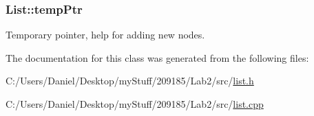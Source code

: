 \subsubsection[{temp\+Ptr}]{\setlength{\rightskip}{0pt plus 5cm}List\+::temp\+Ptr\hspace{0.3cm}{\ttfamily [private]}}\label{class_list_a9a3a51357cab8c53233ba00b8545eb5a}
Temporary pointer, help for adding new nodes. 

The documentation for this class was generated from the following files\+:\begin{DoxyCompactItemize}
\item 
C\+:/\+Users/\+Daniel/\+Desktop/my\+Stuff/209185/\+Lab2/src/\hyperlink{list_8h}{list.\+h}\item 
C\+:/\+Users/\+Daniel/\+Desktop/my\+Stuff/209185/\+Lab2/src/\hyperlink{list_8cpp}{list.\+cpp}\end{DoxyCompactItemize}
